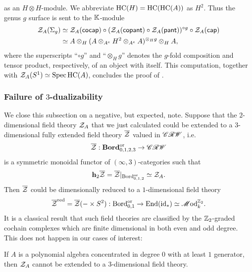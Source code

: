 as an $H \otimes H$-module. We abbreviate $\mathrm{HC}(H) = \mathrm{HC}(\mathrm{HC}(A))$ as $H^2$. Thus the genus $g$ surface is sent to the $\mathbb{K}$-module
\begin{align*}
	\mathcal{Z}_A(\Sigma_g) & \simeq \mathcal{Z}_A(\mathsf{cocap}) \circ (\mathcal{Z}_A(\mathsf{copant}) \circ \mathcal{Z}_A(\mathsf{pant}))^{\circ g} \circ \mathcal{Z}_A(\mathsf{cap}) \\
	& \simeq A \otimes_{H} (A \otimes_{A^e} H^2 \otimes_{A^e} A)^{\otimes_{H} g} \otimes_{H} A,
\end{align*}
where the superscripts ``$\circ g$'' and ``$\otimes_H g$'' denotes the $g$-fold composition and tensor product, respectively, of an object with itself. This computation, together with $\mathcal{Z}_A(S^1) \simeq \operatorname{Spec} \mathrm{HC}(A)$, concludes the proof of .

\subsubsection{Failure of $3$-dualizability}

We close this subsection on a negative, but expected, note. Suppose that the $2$-dimensional field theory $\mathcal{Z}_A$ that we just calculated could be extended to a $3$-dimensional fully extended field theory $\overline{\mathcal{Z}}$ valued in $\mathscr{CRW}$, i.e. 
\begin{equation*}
	\overline{\mathcal{Z}} : \mathbf{Bord}_{0,1,2,3}^{\mathrm{or}} \to \mathscr{CRW}
\end{equation*}
is a symmetric monoidal functor of $(\infty,3)$-categories such that 
\begin{equation*}
	\mathbf{h}_2 \overline{\mathcal{Z}} = \overline{\mathcal{Z}}\vert_{\mathrm{Bord}_{0,1,2}^{\mathrm{or}}} \simeq \mathcal{Z}_A.
\end{equation*}
Then $\overline{\mathcal{Z}}$ could be dimensionally reduced to a $1$-dimensional field theory
\begin{equation*}
	\overline{\mathcal{Z}}^{\mathrm{red}} = \overline{\mathcal{Z}}(- \times S^2) : \mathrm{Bord}^{\mathrm{or}}_{0,1} \to \mathrm{End}(\mathrm{id}_\ast) \simeq \mathscr{M}\mathrm{od}_{k}^{\mathbb{Z}_2}.
\end{equation*}
It is a classical result that such field theories are classified by the $\mathbb{Z}_2$-graded cochain complexes which are finite dimensional in both even and odd degree. This does not happen in our cases of interest:

\begin{prp} \label{prp:no-3-tft}
	If $A$ is a polynomial algebra concentrated in degree $0$ with at least $1$ generator, then $\mathcal{Z}_A$ cannot be extended to a $3$-dimensional field theory.
\end{prp}

